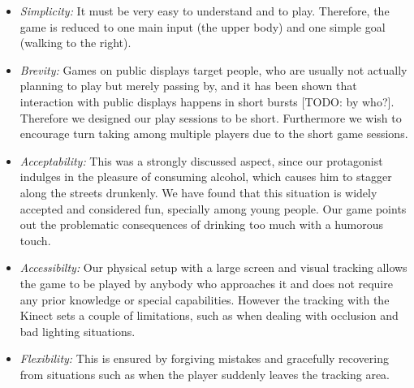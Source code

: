 \documentclass{chi-ext}
\begin{document}
\begin{itemize}\compresslist
\item \textit{Simplicity:} It must be very easy to understand and to play. Therefore, the game is reduced to one main input (the upper body) and one simple goal (walking to the right).
\item \textit{Brevity:} Games on public displays target people, who are usually not actually planning to play but merely passing by, and it has been shown that interaction with public displays happens in short bursts [TODO: by who?]. Therefore we designed our play sessions to be short. Furthermore we wish to encourage turn taking among multiple players due to the short game sessions.
\item \textit{Acceptability:} This was a strongly discussed aspect, since our protagonist indulges in the pleasure of consuming alcohol, which causes him to stagger along the streets drunkenly. We have found that this situation is widely accepted and considered fun, specially among young people. Our game points out the problematic consequences of drinking too much with a humorous touch.
\item \textit{Accessibilty:} Our physical setup with a large screen and visual tracking allows the game to be played by anybody who approaches it and does not require any prior knowledge or special capabilities. However the tracking with the Kinect sets a couple of limitations, such as when dealing with occlusion and bad lighting situations.
\item \textit{Flexibility:} This is ensured by forgiving mistakes and gracefully recovering from situations such as when the player suddenly leaves the tracking area.
\end{itemize}
\end{document}

